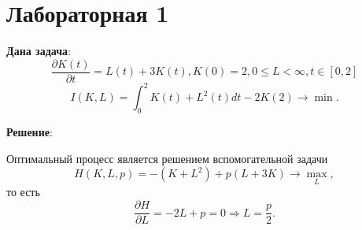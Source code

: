 \documentclass[a4paper, 12pt]{article}
\newcommand{\df}[2]{\frac{\partial #1}{\partial #2}}
\begin{document}
\section{Лабораторная 1}
{\bf Дана задача}:
\begin{equation}
    \dfrac{\partial K(t)}{\partial t}=L(t)+3K(t), K(0)=2,0\le L < \infty, t \in [0,2]
\end{equation}    
\begin{equation}
    I(K,L)=\int_0^2 K(t)+L^2(t) dt - 2 K(2) \rightarrow \min.
\end{equation}

{\bf Решение}:

Оптимальный процесс является решением вспомогательной задачи
\begin{equation}
    H(K,L,p)=-(K+L^2)+p(L+3K)\rightarrow \max_L,
\end{equation}
то есть 
\begin{equation}
   \df{H}{L}=-2L+p=0 \Rightarrow L=\frac{p}{2}.
\end{equation}
\end{document}
